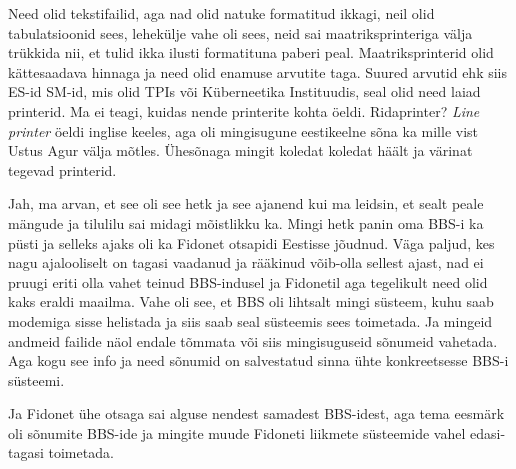 
Need olid tekstifailid, aga nad olid natuke formatitud ikkagi, neil olid tabulatsioonid sees, lehekülje vahe oli sees, neid sai maatriksprinteriga välja trükkida nii, et tulid ikka ilusti formatituna paberi peal. Maatriksprinterid olid kättesaadava hinnaga ja need olid enamuse arvutite taga.  Suured arvutid ehk siis ES-id SM-id, mis olid TPIs või Küberneetika Instituudis, seal olid need laiad printerid. Ma ei teagi, kuidas nende printerite kohta öeldi. Ridaprinter? \emph{Line printer} öeldi inglise keeles, aga  oli mingisugune eestikeelne sõna ka mille vist Ustus Agur välja mõtles. Ühesõnaga mingit koledat koledat häält ja värinat tegevad printerid.


Jah, ma arvan, et see oli see hetk ja see ajanend kui ma leidsin, et sealt  peale mängude ja  tilulilu sai midagi mõistlikku ka. Mingi hetk panin oma BBS-i ka püsti ja selleks ajaks oli ka Fidonet otsapidi Eestisse jõudnud. Väga paljud, kes nagu ajalooliselt on tagasi vaadanud ja rääkinud võib-olla sellest ajast, nad ei pruugi eriti olla vahet teinud BBS-indusel ja Fidonetil aga tegelikult need olid kaks eraldi maailma. Vahe oli see, et BBS oli lihtsalt mingi süsteem, kuhu saab modemiga sisse helistada ja siis saab seal süsteemis sees toimetada. Ja mingeid andmeid failide näol endale tõmmata või siis mingisuguseid sõnumeid vahetada. Aga kogu see info ja need sõnumid on salvestatud sinna ühte konkreetsesse BBS-i süsteemi.

Ja Fidonet ühe otsaga  sai alguse nendest samadest BBS-idest, aga tema eesmärk oli sõnumite BBS-ide ja mingite muude Fidoneti liikmete süsteemide vahel edasi-tagasi toimetada. 


